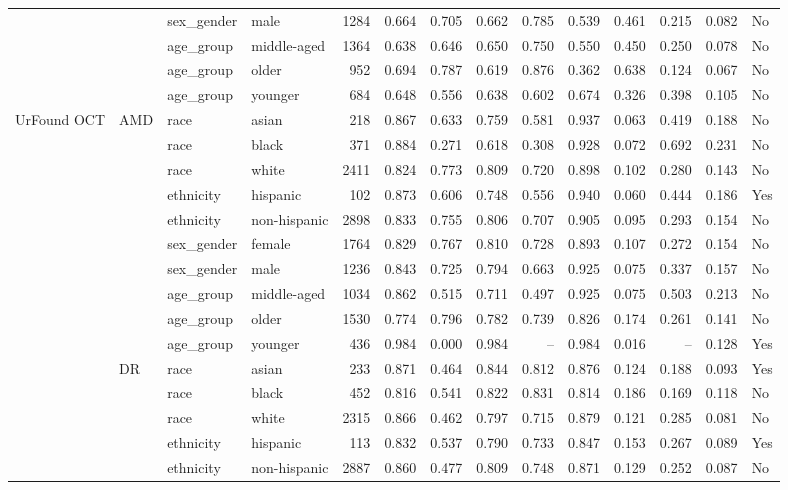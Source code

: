 \begin{longtable}{@{}lll l rrrrrrrr@{}}
 &  & sex\_gender & male & 1284 & 0.664 & 0.705 & 0.662 & 0.785 & 0.539 & 0.461 & 0.215 & 0.082 & No \\
 &  & age\_group & middle-aged & 1364 & 0.638 & 0.646 & 0.650 & 0.750 & 0.550 & 0.450 & 0.250 & 0.078 & No \\
 &  & age\_group & older & 952 & 0.694 & 0.787 & 0.619 & 0.876 & 0.362 & 0.638 & 0.124 & 0.067 & No \\
 &  & age\_group & younger & 684 & 0.648 & 0.556 & 0.638 & 0.602 & 0.674 & 0.326 & 0.398 & 0.105 & No \\
UrFound OCT & AMD & race & asian & 218 & 0.867 & 0.633 & 0.759 & 0.581 & 0.937 & 0.063 & 0.419 & 0.188 & No \\
 &  & race & black & 371 & 0.884 & 0.271 & 0.618 & 0.308 & 0.928 & 0.072 & 0.692 & 0.231 & No \\
 &  & race & white & 2411 & 0.824 & 0.773 & 0.809 & 0.720 & 0.898 & 0.102 & 0.280 & 0.143 & No \\
 &  & ethnicity & hispanic & 102 & 0.873 & 0.606 & 0.748 & 0.556 & 0.940 & 0.060 & 0.444 & 0.186 & Yes \\
 &  & ethnicity & non-hispanic & 2898 & 0.833 & 0.755 & 0.806 & 0.707 & 0.905 & 0.095 & 0.293 & 0.154 & No \\
 &  & sex\_gender & female & 1764 & 0.829 & 0.767 & 0.810 & 0.728 & 0.893 & 0.107 & 0.272 & 0.154 & No \\
 &  & sex\_gender & male & 1236 & 0.843 & 0.725 & 0.794 & 0.663 & 0.925 & 0.075 & 0.337 & 0.157 & No \\
 &  & age\_group & middle-aged & 1034 & 0.862 & 0.515 & 0.711 & 0.497 & 0.925 & 0.075 & 0.503 & 0.213 & No \\
 &  & age\_group & older & 1530 & 0.774 & 0.796 & 0.782 & 0.739 & 0.826 & 0.174 & 0.261 & 0.141 & No \\
 &  & age\_group & younger & 436 & 0.984 & 0.000 & 0.984 & -- & 0.984 & 0.016 & -- & 0.128 & Yes \\
 & DR & race & asian & 233 & 0.871 & 0.464 & 0.844 & 0.812 & 0.876 & 0.124 & 0.188 & 0.093 & Yes \\
 &  & race & black & 452 & 0.816 & 0.541 & 0.822 & 0.831 & 0.814 & 0.186 & 0.169 & 0.118 & No \\
 &  & race & white & 2315 & 0.866 & 0.462 & 0.797 & 0.715 & 0.879 & 0.121 & 0.285 & 0.081 & No \\
 &  & ethnicity & hispanic & 113 & 0.832 & 0.537 & 0.790 & 0.733 & 0.847 & 0.153 & 0.267 & 0.089 & Yes \\
 &  & ethnicity & non-hispanic & 2887 & 0.860 & 0.477 & 0.809 & 0.748 & 0.871 & 0.129 & 0.252 & 0.087 & No \\

\end{longtable}
